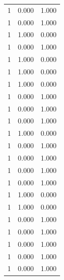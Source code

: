 \begin{tabular}{rrr}
1 & 0.000 & 1.000 \\
1 & 0.000 & 1.000 \\
1 & 1.000 & 0.000 \\
1 & 0.000 & 1.000 \\
1 & 1.000 & 0.000 \\
1 & 1.000 & 0.000 \\
1 & 1.000 & 0.000 \\
1 & 0.000 & 1.000 \\
1 & 0.000 & 1.000 \\
1 & 0.000 & 1.000 \\
1 & 1.000 & 0.000 \\
1 & 0.000 & 1.000 \\
1 & 0.000 & 1.000 \\
1 & 0.000 & 1.000 \\
1 & 0.000 & 1.000 \\
1 & 1.000 & 0.000 \\
1 & 1.000 & 0.000 \\
1 & 0.000 & 1.000 \\
1 & 0.000 & 1.000 \\
1 & 0.000 & 1.000 \\
1 & 0.000 & 1.000 \\
1 & 0.000 & 1.000 \\
\bottomrule
\end{tabular}
